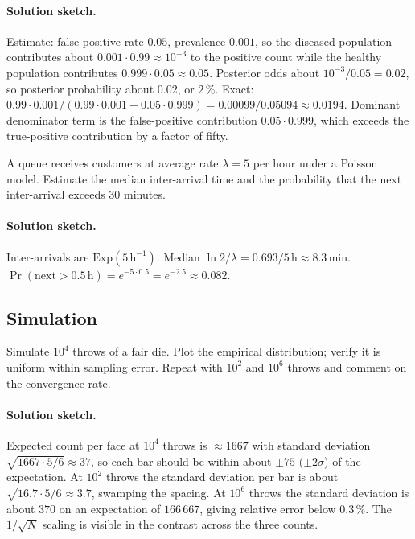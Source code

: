 \paragraph{Solution sketch.}
Estimate: false-positive rate $0.05$, prevalence $0.001$, so the
diseased population contributes about $0.001 \cdot 0.99 \approx
10^{-3}$ to the positive count while the healthy population
contributes $0.999 \cdot 0.05 \approx 0.05$. Posterior odds about
$10^{-3} / 0.05 = 0.02$, so posterior probability about $0.02$, or
$2\,\%$. Exact: $0.99 \cdot 0.001 / (0.99 \cdot 0.001 + 0.05 \cdot
0.999) = 0.00099 / 0.05094 \approx 0.0194$. Dominant denominator
term is the false-positive contribution $0.05 \cdot 0.999$, which
exceeds the true-positive contribution by a factor of fifty.

\begin{exercise}
A queue receives customers at average rate $\lambda = 5$ per hour
under a Poisson model. Estimate the median inter-arrival time and
the probability that the next inter-arrival exceeds 30 minutes.
\end{exercise}

\paragraph{Solution sketch.}
Inter-arrivals are $\mathrm{Exp}(5\,\text{h}^{-1})$. Median $\ln 2 /
\lambda = 0.693 / 5\,\text{h} \approx 8.3\,\text{min}$. $\Pr(\text{
next} > 0.5\,\text{h}) = e^{-5 \cdot 0.5} = e^{-2.5} \approx 0.082$.

\subsection*{Simulation}

\begin{exercise}
Simulate $10^{4}$ throws of a fair die. Plot the empirical
distribution; verify it is uniform within sampling error. Repeat
with $10^{2}$ and $10^{6}$ throws and comment on the convergence
rate.
\end{exercise}

\paragraph{Solution sketch.}
Expected count per face at $10^{4}$ throws is $\approx 1667$ with
standard deviation $\sqrt{1667 \cdot 5/6} \approx 37$, so each bar
should be within about $\pm 75$ ($\pm 2\sigma$) of the expectation.
At $10^{2}$ throws the standard deviation per bar is about $\sqrt{
16.7 \cdot 5/6} \approx 3.7$, swamping the spacing. At $10^{6}$
throws the standard deviation is about $370$ on an expectation of
$166\,667$, giving relative error below $0.3\,\%$. The
$1/\sqrt{N}$ scaling is visible in the contrast across the three
counts.

